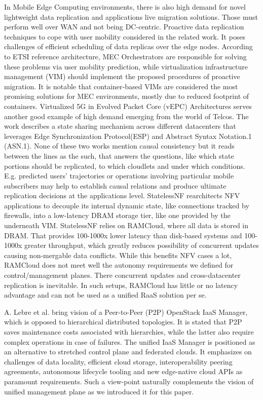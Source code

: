 \documentclass[conference]{IEEEtran}
\begin{document}
In Mobile Edge Computing environments, there is also high demand for novel
lightweight data replication and applications live migration solutions. Those
must perform well over WAN and not being DC-centric. Proactive data replication
techniques to cope with user mobility considered in the related work\cite{b14}.
It poses challenges of efficient scheduling of data replicas over the edge
nodes. According to ETSI reference architecture, MEC Orchestrators are
responsible for solving these problems via user mobility prediction, while
virtualization infrastructure management (VIM) should implement the proposed
procedures of proactive migration. It is notable that container‐based VIMs are
considered the most promising solutions for MEC environments, mostly due to
reduced footprint of containers. Virtualized 5G in Evolved Packet Core (vEPC)
Architectures\cite{b15} serves another good example of high demand emerging
from the world of Telcos. The work describes a state sharing mechanism across
different datacenters that leverages Edge Synchronization Protocol(ESP) and
Abstract Syntax Notation.1 (ASN.1). None of these two works mention
causal consistency but it reads between the lines as the such, that answers the
questions, like which state portions should be replicated, to which cloudlets
and under which conditions. E.g. predicted users' trajectories or operations
involving particular mobile subscribers may help to establish causal relations
and produce ultimate replication decisions at the applications level.
StatelessNF\cite{b16} rearchitects NFV applications to decouple its internal
dynamic state, like connections tracked by firewalls, into a low-latency DRAM
storage tier, like one provided by the underneath VIM. StatelessNF relies on
RAMCloud\cite{b17}, where all data is stored in DRAM. That provides 100-1000x
lower latency than disk-based systems and 100-1000x greater throughput, which
greatly reduces possibility of concurrent updates causing non-mergable data
conflicts. While this benefits NFV cases a lot, RAMCloud does not meet well
the autonomy requirements we defined for control/management planes. There
concurrent updates and cross-datacenter replication is inevitable. In such
setups, RAMCloud has little or no latency advantage and can not be used as
a unified RaaS solution per se.

A. Lebre et al.\cite{b9} bring vision of a Peer-to-Peer (P2P) OpenStack IaaS
Manager, which is opposed to hierarchical distributed topologies. It is stated
that P2P saves maintenance costs associated with hierarchies, while the latter
also require complex operations in case of failures. The unified IaaS Manager
is positioned as an alternative to stretched control plane and federated
clouds. It emphasizes on challenges of data locality, efficient cloud storage,
interoperability peering agreements, autonomous lifecycle tooling and new
edge-native cloud APIs as paramount requirements. Such a view-point naturally
complements the vision of unified management plane as we introduced it for this
paper.
\end{document}
